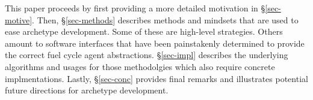 This paper proceeds by first providing a more detailed motivation 
in \S \ref{sec-motive}. Then, \S \ref{sec-methods} describes 
methods and mindsets that are used to ease archetype development.
Some of these are high-level strategies. Others amount to 
software interfaces that have been painstakenly determined to 
provide the correct fuel cycle agent abstractions. 
\S \ref{sec-impl} describes the underlying algorithms and usages
for those methodolgies which also require concrete implmentations.
Lastly, \S \ref{sec-conc} provides final remarks and illustrates
potential future directions for \cyclus archetype development.
